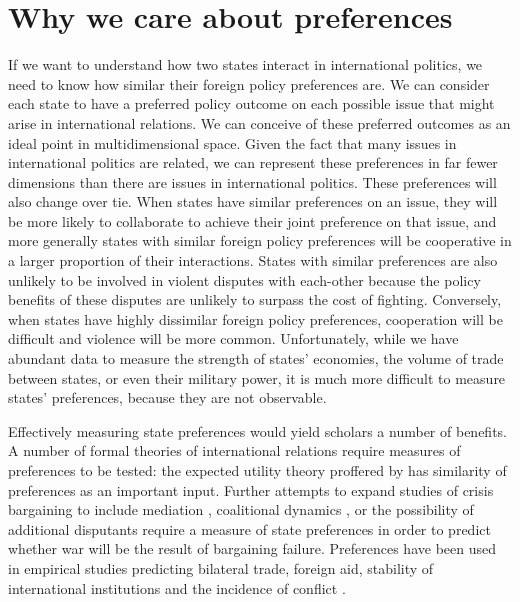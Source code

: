 \section*{Why we care about preferences}

If we want to understand how two states interact in international politics, we need to know how similar their foreign policy preferences are. We can consider each state to have a preferred policy outcome on each possible issue that might arise in international relations. We can conceive of these preferred outcomes as an ideal point in multidimensional space. Given the fact that many issues in international politics are related, we can represent these preferences in far fewer dimensions than there are issues in international politics. These preferences will also change over tie. When states have similar preferences on an issue, they will be more likely to collaborate to achieve their joint preference on that issue, and more generally states with similar foreign policy preferences will be cooperative in a larger proportion of their interactions. States with similar preferences are also unlikely to be involved in violent disputes with each-other because the policy benefits of these disputes are unlikely to surpass the cost of fighting. Conversely, when states have highly dissimilar foreign policy preferences, cooperation will be difficult and violence will be more common. Unfortunately, while we have abundant data to measure the strength of states' economies, the volume of trade between states, or even their military power, it is much more difficult to measure states' preferences, because they are not observable.

Effectively measuring state preferences would yield scholars a number of benefits. A number of formal theories of international relations require measures of preferences to be tested: the expected utility theory proffered by \citep{buenodemesquita:1983} has similarity of preferences as an important input. Further attempts to expand studies of crisis bargaining to include mediation \citep{kydd:2003}, coalitional dynamics \citep{wolford:2014}, or the possibility of additional disputants \citep{gallop:2017} require a measure of state preferences in order to predict whether war will be the result of bargaining failure. Preferences have been used in empirical studies predicting bilateral trade, foreign aid, stability of international institutions and the incidence of conflict \citep{derouen:heo:2004, stone:2004, gartzke:2007, kastner:2007, braumoeller:2008}. 

